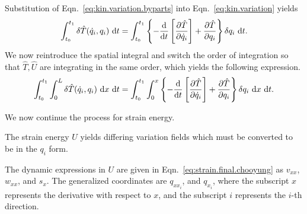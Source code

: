 Substitution of Eqn.~\ref{eq:kin.variation.byparts} into Eqn.~\ref{eq:kin.variation} yields
\begin{equation}
\int_{t_0}^{t_1}\delta\hat T(\dot q_i,q_i)\text{ d}t = \int_{t_0}^{t_1}\left\lbrace-\frac{\text d}{\text dt}\left[\frac{\partial\hat T}{\partial \dot q_i}\right]+\frac{\partial\hat T}{\partial q_i}\right\rbrace\delta q_i\text{ d}t.
\end{equation}
We now reintroduce the spatial integral and switch the order of integration so that $\hat T,\hat U$ are integrating in the same order, which yields the following expression.
\begin{equation}
\int_{t_0}^{t_1}\int_0^L\delta\hat T(\dot q_i,q_i)\text{ d}x\text{ d}t = \int_{t_0}^{t_1}\int_0^x\left\lbrace-\frac{\text d}{\text dt}\left[\frac{\partial\hat T}{\partial \dot q_i}\right]+\frac{\partial\hat T}{\partial q_i}\right\rbrace\delta q_i\text{ d}x\text{ d}t.
\end{equation}

We now continue the process for strain energy.

The strain energy $U$ yields differing variation fields which must be converted to be in the $q_i$ form.

The dynamic expressions in $U$ are given in Eqn.~\ref{eq:strain.final.chooyung} as $v_{xx}$, $w_{xx}$, and $s_x$. The generalized coordinates are $q_{xx_i}$, and $q_{x_i}$, where the subscript $x$ represents the derivative with respect to $x$, and the subscript $i$ represents the $i$-th direction.

